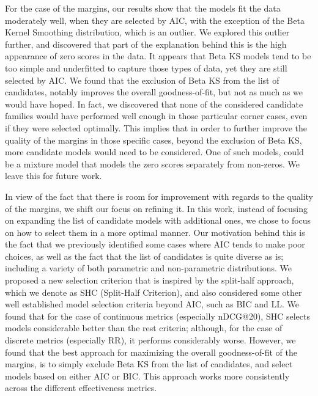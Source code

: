 For the case of the margins, our results show that the models fit the data moderately well, when they are selected by AIC, with the exception of the Beta Kernel Smoothing distribution, which is an outlier. We explored this outlier further, and discovered that part of the explanation behind this is the high appearance of zero scores in the data. It appears that Beta KS models tend to be too simple and underfitted to capture those types of data, yet they are still selected by AIC. We found that the exclusion of Beta KS from the list of candidates, notably improves the overall goodness-of-fit, but not as much as we would have hoped. In fact, we discovered that none of the considered candidate families would have performed well enough in those particular corner cases, even if they were selected optimally. This implies that in order to further improve the quality of the margins in those specific cases, beyond the exclusion of Beta KS, more candidate models would need to be considered. One of such models, could be a mixture model that models the zero scores separately from non-zeros. We leave this for future work.

In view of the fact that there is room for improvement with regards to the quality of the margins, we shift our focus on refining it. In this work, instead of focusing on expanding the list of candidate models with additional ones, we chose to focus on how to select them in a more optimal manner. Our motivation behind this is the fact that we previously identified some cases where AIC tends to make poor choices, as well as the fact that the list of candidates is quite diverse as is; including a variety of both parametric and non-parametric distributions. We proposed a new selection criterion that is inspired by the split-half approach, which we denote as SHC (Split-Half Criterion), and also considered some other well established model selection criteria beyond AIC, such as BIC and LL. We found that for the case of continuous metrics (especially nDCG@20), SHC selects models considerable better than the rest criteria; although, for the case of discrete metrics (especially RR), it performs considerably worse. However, we found that the best approach for maximizing the overall goodness-of-fit of the margins, is to simply exclude Beta KS from the list of candidates, and select models based on either AIC or BIC. This approach works more consistently across the different effectiveness metrics.

